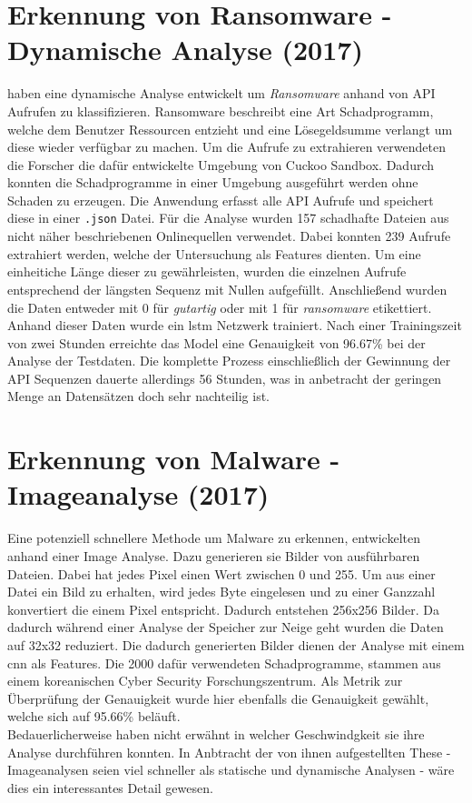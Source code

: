 \documentclass[
    12pt, %
    DIV10,
    ngerman, %
    a4paper, %
    oneside, %
    titlepage, %
    parskip=half, %
    headings=normal, %
    listof=totoc, %
    bibliography=totoc, %
    index=totoc, %
    captions=tableheading, %
    final %
]{scrreprt}
\begin{document}
\section{Erkennung von Ransomware - Dynamische Analyse (2017)}
\citeauthor{Maniath2018} haben eine dynamische Analyse entwickelt um \emph{Ransomware} anhand von API Aufrufen zu klassifizieren. Ransomware beschreibt eine Art Schadprogramm, welche dem Benutzer Ressourcen entzieht und eine Lösegeldsumme verlangt um diese wieder verfügbar zu machen. Um die Aufrufe zu extrahieren verwendeten die Forscher die dafür entwickelte Umgebung von Cuckoo Sandbox. Dadurch konnten die Schadprogramme in einer Umgebung ausgeführt werden ohne Schaden zu erzeugen. Die Anwendung erfasst alle API Aufrufe und speichert diese in einer \texttt{.json} Datei. Für die Analyse wurden 157 schadhafte Dateien aus nicht näher beschriebenen Onlinequellen verwendet. Dabei konnten 239 Aufrufe extrahiert werden, welche der Untersuchung als Features dienten. Um eine einheitiche Länge dieser zu gewährleisten, wurden die einzelnen Aufrufe entsprechend der längsten Sequenz mit Nullen aufgefüllt. Anschließend wurden die Daten entweder mit 0 für \emph{gutartig} oder mit 1 für \emph{ransomware} etikettiert. Anhand dieser Daten wurde ein \ac{lstm} Netzwerk trainiert. Nach einer Trainingszeit von zwei Stunden erreichte das Model eine Genauigkeit von 96.67\% bei der Analyse der Testdaten. Die komplette Prozess einschließlich der Gewinnung der API Sequenzen dauerte allerdings 56 Stunden, was in anbetracht der geringen Menge an Datensätzen doch sehr nachteilig ist.
%
\section{Erkennung von Malware - Imageanalyse (2017)}
Eine potenziell schnellere Methode um Malware zu erkennen, entwickelten \citeauthor{8190895} anhand einer Image Analyse. Dazu generieren sie Bilder von ausführbaren Dateien. Dabei hat jedes Pixel einen Wert zwischen 0 und 255. Um aus einer Datei ein Bild zu erhalten, wird jedes Byte eingelesen und zu einer Ganzzahl konvertiert die einem Pixel entspricht. Dadurch entstehen 256x256 Bilder. Da dadurch während einer Analyse der Speicher zur Neige geht wurden die Daten auf 32x32 reduziert. Die dadurch generierten Bilder dienen der Analyse mit einem \ac{cnn} als Features. Die 2000 dafür verwendeten Schadprogramme, stammen aus einem koreanischen Cyber Security Forschungszentrum. Als Metrik zur Überprüfung der Genauigkeit wurde hier ebenfalls die Genauigkeit gewählt, welche sich auf 95.66\% beläuft.\\
Bedauerlicherweise haben \citeauthor{8190895} nicht erwähnt in welcher Geschwindgkeit sie ihre Analyse durchführen konnten. In Anbtracht der von ihnen aufgestellten These - Imageanalysen seien viel schneller als statische und dynamische Analysen - wäre dies ein interessantes Detail gewesen.
\end{document}
